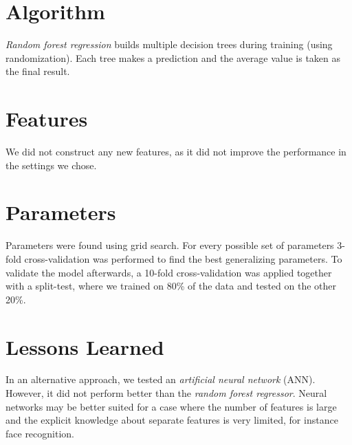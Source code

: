 \documentclass[a4paper, 11pt]{article}
\begin{document}
\section{Algorithm}
\textit{Random forest regression} builds multiple decision trees during training (using randomization). Each tree makes a prediction and the average value is taken as the final result.

\section{Features}
We did not construct any new features, as it did not improve the performance in the settings we chose.

\section{Parameters}
Parameters were found using grid search. For every possible set of parameters 3-fold cross-validation was performed to find the best generalizing parameters. To validate the model afterwards, a 10-fold cross-validation was applied together with a split-test, where we trained on 80\% of the data and tested on the other 20\%.

\section{Lessons Learned} In an alternative approach, we tested an \textit{artificial neural network} (ANN). However, it did not perform better than the \textit{random forest regressor}. Neural networks may be better suited for a case where the number of features is large and the explicit knowledge about separate features is very limited, for instance face recognition.
\end{document}
